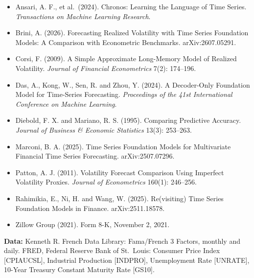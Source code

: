 \begin{itemize}
  \item Ansari, A. F., et al.\ (2024). Chronos: Learning the Language of Time Series. \emph{Transactions on Machine Learning Research}.
  \item Brini, A. (2026). Forecasting Realized Volatility with Time Series Foundation Models: A Comparison with Econometric Benchmarks. arXiv:2607.05291.
  \item Corsi, F. (2009). A Simple Approximate Long-Memory Model of Realized Volatility. \emph{Journal of Financial Econometrics} 7(2): 174--196.
  \item Das, A., Kong, W., Sen, R. and Zhou, Y. (2024). A Decoder-Only Foundation Model for Time-Series Forecasting. \emph{Proceedings of the 41st International Conference on Machine Learning}.
  \item Diebold, F. X. and Mariano, R. S. (1995). Comparing Predictive Accuracy. \emph{Journal of Business \& Economic Statistics} 13(3): 253--263.
  \item Marconi, B. A. (2025). Time Series Foundation Models for Multivariate Financial Time Series Forecasting. arXiv:2507.07296.
  \item Patton, A. J. (2011). Volatility Forecast Comparison Using Imperfect Volatility Proxies. \emph{Journal of Econometrics} 160(1): 246--256.
  \item Rahimikia, E., Ni, H. and Wang, W. (2025). Re(visiting) Time Series Foundation Models in Finance. arXiv:2511.18578.
  \item Zillow Group (2021). Form 8-K, November 2, 2021.
\end{itemize}

\textbf{Data:} Kenneth R. French Data Library: Fama/French 3 Factors, monthly and daily. FRED, Federal Reserve Bank of St.\ Louis: Consumer Price Index [CPIAUCSL], Industrial Production [INDPRO], Unemployment Rate [UNRATE], 10-Year Treasury Constant Maturity Rate [GS10].
